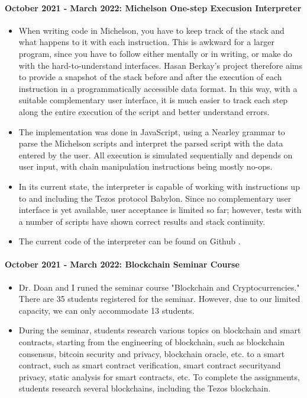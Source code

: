 \documentclass[a4paper,11pt]{article}
\begin{document}
\paragraph{October 2021 - March 2022: Michelson One-step Execusion Interpreter} 
\begin{itemize}
\item When writing code in Michelson, you have to keep track of the stack and what happens to it with each instruction. This is awkward for a larger program, since you have to follow either mentally or in writing, or make do with the hard-to-understand interfaces. Hasan Berkay's project therefore aims to provide a snapshot of the stack before and after the execution of each instruction in a programmatically accessible data format. In this way, with a suitable complementary user interface, it is much easier to track each step along the entire execution of the script and better understand errors. 
\item The implementation was done in
JavaScript, using a Nearley grammar to parse the Michelson scripts and interpret the parsed script with the data entered by the user.
All execution is simulated sequentially and depends on user input, with chain manipulation instructions being mostly no-ops. 
\item In its current state, the interpreter is capable of working with instructions up to and including the Tezos protocol Babylon. Since no complementary user interface is yet available, user acceptance is limited so far; however, tests with a number of scripts have shown correct results and stack continuity.
\item The current code of the interpreter can be found on Github \cite{michelson-interpreter}.
\end{itemize}

\paragraph{October 2021 - March 2022: Blockchain Seminar Course} 
\begin{itemize}
\item Dr. Doan and I runed the seminar course "Blockchain and Cryptocurrencies." There are 35 students registered for the seminar. However, due to our limited capacity, we can only accommodate 13 students. 
\item During the seminar, students research various topics on blockchain and smart contracts, starting from the engineering of blockchain, such as blockchain consensus, bitcoin security and privacy, blockchain oracle, etc. to a smart contract, such as smart contract verification, smart contract securityand privacy, static analysis for smart contracts, etc. To complete the assignments, students research several blockchains, including the Tezos blockchain.
\end{itemize}
\end{document}
